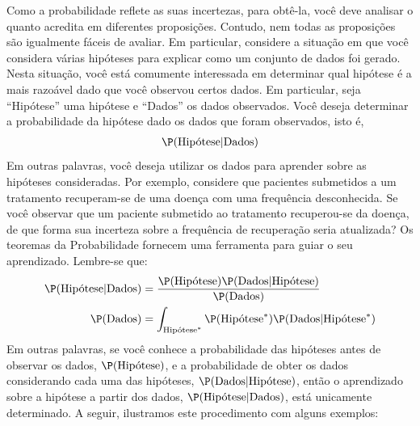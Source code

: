 Como a probabilidade reflete as suas incertezas,
para obtê-la, você deve analisar o quanto 
acredita em diferentes proposições.
Contudo, nem todas as proposições são 
igualmente fáceis de avaliar.
Em particular, considere a situação em que 
você considera várias hipóteses para 
explicar como um conjunto de dados foi gerado.
Nesta situação, você está comumente interessada em
determinar qual hipótese é 
a mais razoável dado que 
você observou certos dados.
Em particular, seja ``Hipótese'' uma 
hipótese e ``Dados'' os dados observados.
Você deseja determinar a probabilidade da 
hipótese dado  os dados que 
foram observados, isto é,
\begin{align*}
 \P(\text{Hipótese}|\text{Dados})
\end{align*}
Em outras palavras, você deseja 
utilizar os dados para 
aprender sobre as hipóteses consideradas.
Por exemplo, considere que pacientes submetidos 
a um tratamento recuperam-se de uma doença com 
uma frequência desconhecida.
Se você observar que um paciente submetido ao 
tratamento recuperou-se da doença,
de que forma sua incerteza sobre a 
frequência de recuperação seria atualizada?
Os teoremas da Probabilidade fornecem uma 
ferramenta para guiar o seu aprendizado.
Lembre-se que:
\begin{align*}
 \P(\text{Hipótese}|\text{Dados})
 &=\frac{\P(\text{Hipótese})\P(\text{Dados}|\text{Hipótese})}{\P(\text{Dados})} \\
 \P(\text{Dados})
 &= \int_{\text{Hipótese}^{*}}{\P(\text{Hipótese}^{*})\P(\text{Dados}|\text{Hipótese}^{*})}
\end{align*}
Em outras palavras, se você conhece a
probabilidade das hipóteses antes de observar os dados, $\P(\text{Hipótese})$, e a 
probabilidade de obter os dados considerando cada 
uma das hipóteses, $\P(\text{Dados}|\text{Hipótese})$,
então o aprendizado sobre a hipótese a partir dos 
dados, $\P(\text{Hipótese}|\text{Dados})$, está 
unicamente determinado.
A seguir, ilustramos este procedimento com 
alguns exemplos:

